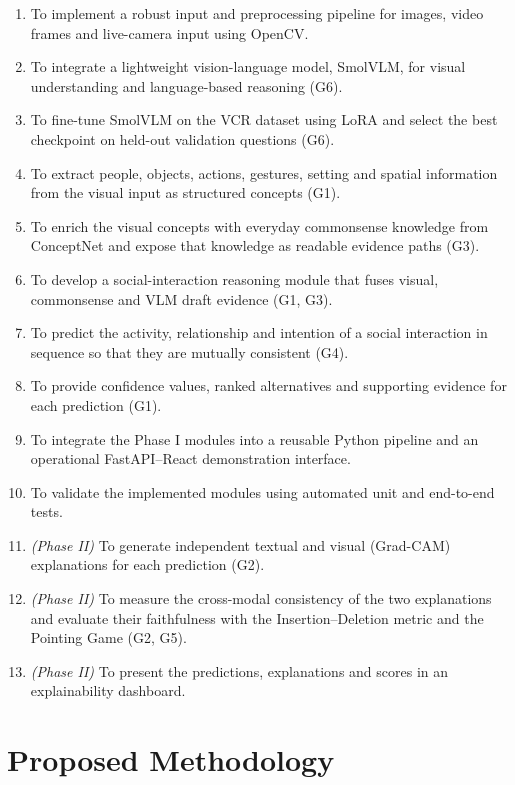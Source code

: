 \documentclass[12pt,a4paper,oneside]{report}
\begin{document}
\begin{enumerate}[leftmargin=*]
\item To implement a robust input and preprocessing pipeline for images, video
  frames and live-camera input using OpenCV.
\item To integrate a lightweight vision-language model, SmolVLM, for visual
  understanding and language-based reasoning (G6).
\item To fine-tune SmolVLM on the VCR dataset using LoRA and select the best
  checkpoint on held-out validation questions (G6).
\item To extract people, objects, actions, gestures, setting and spatial
  information from the visual input as structured concepts (G1).
\item To enrich the visual concepts with everyday commonsense knowledge from
  ConceptNet and expose that knowledge as readable evidence paths (G3).
\item To develop a social-interaction reasoning module that fuses visual,
  commonsense and VLM draft evidence (G1, G3).
\item To predict the activity, relationship and intention of a social
  interaction in sequence so that they are mutually consistent (G4).
\item To provide confidence values, ranked alternatives and supporting evidence
  for each prediction (G1).
\item To integrate the Phase I modules into a reusable Python pipeline and an
  operational FastAPI--React demonstration interface.
\item To validate the implemented modules using automated unit and end-to-end
  tests.
\item \emph{(Phase II)} To generate independent textual and visual (Grad-CAM)
  explanations for each prediction (G2).
\item \emph{(Phase II)} To measure the cross-modal consistency of the two
  explanations and evaluate their faithfulness with the Insertion--Deletion
  metric and the Pointing Game (G2, G5).
\item \emph{(Phase II)} To present the predictions, explanations and scores in
  an explainability dashboard.
\end{enumerate}

\chapter{Proposed Methodology}
\label{ch:method}
\end{document}
